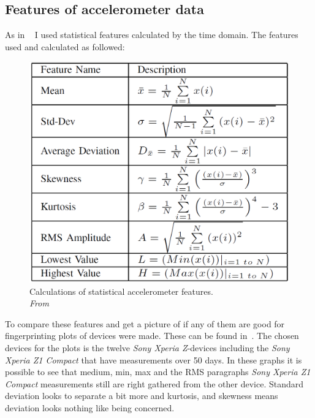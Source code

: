 \subsection{Features of accelerometer data}\label{sec:featuresAcc}
As in ~\cite{sensor:accelPrint} I used statistical features calculated by the time domain. The features used and calculated as followed:
\begin{figure}[H]
	\centering
	\includegraphics[scale=.35]{img/featureCalc}
	\caption{Calculations of statistical accelerometer features. \\\textit{From~\cite[p.6]{sensor:accelPrint}}}
	\label{fig:accFeatures}
\end{figure}
To compare these features and get a picture of if any of them are good for fingerprinting plots of devices were made. These can be found in~. The chosen devices for the plots is the twelve \textit{Sony Xperia Z}-devices including the \textit{Sony Xperia Z1 Compact} that have measurements over 50 days. In these graphs it is possible to see that medium, min, max and the RMS paragraphs \textit{Sony Xperia Z1 Compact} measurements still are right gathered from the other device. Standard deviation looks to separate a bit more and kurtosis, and skewness means deviation looks nothing like being concerned.\\
